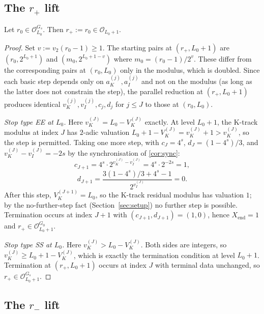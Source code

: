 \documentclass[11pt,reqno]{amsart}
\newcommand{\Obs}{\mathcal{O}}
\newcommand{\Xend}{X_{\mathrm{end}}}
\newcommand{\Vk}{V_{K}}
\newcommand{\vk}{v_{K}}
\newcommand{\vi}{v_{I}}
\newcommand{\vtwo}{v_{2}}
\begin{document}
\subsection{The \texorpdfstring{$r_+$}{r+} lift}

\begin{theorem}\label{thm:lift-plus}
Let $r_0 \in \Obs_{L_0}^{G_s}$. Then $r_+ := r_0 \in \Obs_{L_0+1}$.
\end{theorem}

\begin{proof}
Set $v := \vtwo(r_0 - 1) \ge 1$.
The starting pairs at $(r_+, L_0+1)$ are $(r_0, 2^{L_0+1})$ and
$(m_0, 2^{L_0+1-v})$ where $m_0 = (r_0 - 1)/2^v$. These differ from the
corresponding pairs at $(r_0, L_0)$ only in the modulus, which is doubled.
Since each basic step depends only on $a_K^{(j)}, a_I^{(j)}$ and not on
the modulus (as long as the latter does not constrain the step), the
parallel reduction at $(r_+, L_0+1)$ produces identical
$\vk^{(j)}, \vi^{(j)}, c_j, d_j$ for $j \le J$ to those at $(r_0, L_0)$.

\emph{Stop type EE at $L_0$.} Here $\vk^{(J)} = L_0 - \Vk^{(J)}$ exactly. At
level $L_0 + 1$, the K-track modulus at index $J$ has $2$-adic valuation
$L_0 + 1 - \Vk^{(J)} = \vk^{(J)} + 1 > \vk^{(J)}$, so the step is permitted.
Taking one more step, with $c_J = 4^s$, $d_J = (1 - 4^s)/3$, and
$\vk^{(J)} - \vi^{(J)} = -2s$ by the synchronisation of \cref{cor:sync}:
\[
c_{J+1} = 4^s \cdot 2^{\vk^{(J)} - \vi^{(J)}} = 4^s \cdot 2^{-2s} = 1,
\]
\[
d_{J+1} = \frac{3(1 - 4^s)/3 + 4^s - 1}{2^{\vi^{(J)}}} = 0.
\]
After this step, $\Vk^{(J+1)} = L_0$, so the K-track residual modulus has
valuation $1$; by the no-further-step fact (Section~\ref{sec:setup}) no further
step is possible. Termination
occurs at index $J+1$ with
$(c_{J+1}, d_{J+1}) = (1, 0)$, hence $\Xend = 1$ and
$r_+ \in \Obs_{L_0+1}^{G_0}$.

\emph{Stop type SS at $L_0$.} Here $\vk^{(J)} > L_0 - \Vk^{(J)}$. Both
sides are integers, so $\vk^{(J)} \ge L_0 + 1 - \Vk^{(J)}$, which is exactly the
termination condition at level $L_0 + 1$. Termination at $(r_+, L_0+1)$
occurs at index $J$ with terminal data unchanged, so
$r_+ \in \Obs_{L_0+1}^{G_s}$. \qedhere
\end{proof}

\subsection{The \texorpdfstring{$r_-$}{r-} lift}
\end{document}

